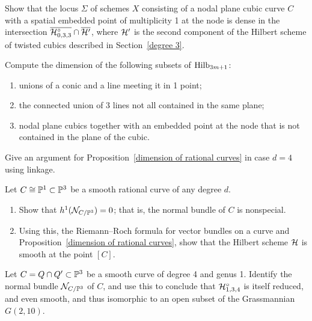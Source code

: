 \begin{exercise}\label{hilb intersection}
Show that the locus $\Sigma$ of schemes $X$ consisting of a nodal plane
cubic curve $C$ with a spatial embedded point of multiplicity 1 at the
node is dense in the intersection $\overline{\cH^\circ_{0,3,3}} \cap
\overline{\cH'}$, where $\cH'$ is the second component of the Hilbert
scheme of twisted cubics described in Section~\ref{degree 3}.
\end{exercise}

\begin{exercise}
 Compute the dimension of the following subsets of $\Hilb_{3m+1}$:
%

\begin{enumerate}
 \item unions of a conic and a line meeting it in 1 point;
 \item the connected union of 3 lines not all contained in the same plane;
 \item nodal plane cubics together with an embedded point at the node
 that is not contained in the plane of
 the cubic.
\end{enumerate}\label{tnih19.3}
\end{exercise}

\begin{exercise}
Give an argument for Proposition~\ref{dimension of rational curves}
in case $d=4$ using linkage.
\end{exercise}

\begin{exercise}
Let $C \cong \PP^1 \subset \PP^3$ be a
smooth rational curve
 of any
%
degree $d$.
\begin{enumerate}
\item Show that $h^1(\cN_{C/\PP^3}) = 0$; that is, the normal bundle of
$C$ is nonspecial.
\item Using this, the
Riemann--Roch formula
%
for vector bundles on a curve
and Proposition~\ref{dimension of rational curves}, show that the Hilbert
scheme $\cH$ is smooth at the point $[C]$.
\end{enumerate}\label{tnih19.5}
\end{exercise}

\begin{exercise}\label{hilb 1,3,4}
Let $C = Q \cap Q' \subset \PP^3$ be a smooth curve of degree 4 and genus
1. Identify the normal bundle $\cN_{C/\PP^3}$ of $C$, and use this to
conclude that $\cH^\circ_{1,3,4}$ is itself reduced, and even smooth,
%
and thus isomorphic to an open subset of the Grassmannian $G(2,10)$.
\end{exercise}

